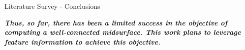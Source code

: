 \begin{frame}[<+-| alert@+>]{Literature Survey - Conclusions}

\centering
{\em \bfseries \large Thus, so far, there has been a limited success in the objective of computing a well-connected midsurface. This work plans to leverage feature information to achieve this objective.}



\end{frame}
